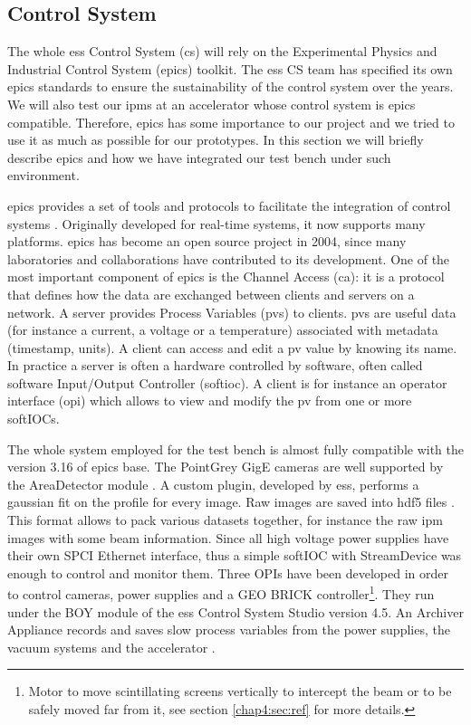 \begin{refsection}
  

  \subsection{Control System}
  The whole \acrshort{ess} Control System (\acrshort{cs}) will rely on the Experimental Physics and Industrial Control System (\acrshort{epics}) toolkit. The \acrshort{ess} CS team has specified its own \acrshort{epics} standards to ensure the sustainability of the control system over the years. We will also test our \acrshort{ipm}s at an accelerator whose control system is \acrshort{epics} compatible. Therefore, \acrshort{epics} has some importance to our project and we tried to use it as much as possible for our prototypes. In this section we will briefly describe \acrshort{epics} and how we have integrated our test bench under such environment.

  \acrshort{epics} provides a set of tools and protocols to facilitate the integration of control systems \cite{epics2019}. Originally developed for real-time systems, it now supports many platforms. \acrshort{epics} has become an open source project in 2004, since many laboratories and collaborations have contributed to its development.
  One of the most important component of \acrshort{epics} is the Channel Access (\acrshort{ca}): it is a protocol that defines how the data are exchanged between clients and servers on a network. A server provides Process Variables (\acrshort{pv}s) to clients. \acrshort{pv}s are useful data (for instance a current, a voltage or a temperature) associated with metadata (timestamp, units). A client can access and edit a \acrshort{pv} value by knowing its name. In practice a server is often a hardware controlled by software, often called software Input/Output Controller (\acrshort{softioc}). A client is for instance an operator interface (\acrshort{opi}) which allows to view and modify the \acrshort{pv} from one or more softIOCs.

  The whole system employed for the test bench is almost fully compatible with the version 3.16 of \acrshort{epics} base. The PointGrey GigE cameras are well supported by the AreaDetector module \cite{ad2019}. A custom plugin, developed by \acrshort{ess}, performs a gaussian fit on the profile for every image. Raw images are saved into \acrshort{hdf}5 files \cite{hdf5}. This format allows to pack various datasets together, for instance the raw \acrshort{ipm} images with some beam information.
  Since all high voltage power supplies have their own SPCI Ethernet interface, thus a simple softIOC with StreamDevice\cite{streamdevice2019} was enough to control and monitor them.
  Three OPIs have been developed in order to control cameras, power supplies and a GEO BRICK controller\footnote{Motor to move scintillating screens vertically to intercept the beam or to be safely moved far from it, see section \ref{chap4:sec:ref} for more details.}. They run under the BOY module of the \acrshort{ess} Control System Studio version 4.5. An Archiver Appliance records and saves slow process variables from the power supplies, the vacuum systems and the accelerator \cite{archiver2019}.


\end{refsection}
